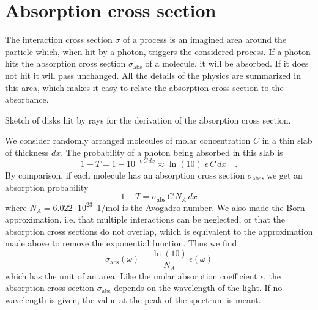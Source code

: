\section{Absorption cross section}


The interaction cross section $\sigma$ of a process is an imagined area around the particle which, when hit by a photon, triggers the considered process. If a photon hits the absorption cross section $\sigma_{\text{abs}}$ of a molecule, it will be absorbed. If it does not hit it will pass unchanged. All the details of the physics are summarized in this area, which makes it easy to relate the absorption cross section to the absorbance.


\begin{marginfigure}
\caption{Sketch of  disks hit by rays for the derivation of the absorption cross section.}
\end{marginfigure}


We consider randomly arranged molecules of molar concentration $C$ in a thin slab of thickness $dx$. The probability of a photon being absorbed in this slab is
\begin{equation}
 1 - T =1 - 10^{- \epsilon\, C \, dx} \approx \ln (10) \; \epsilon\, C \, dx \quad .
\end{equation}
By comparison, if each molecule has an absorption cross section $\sigma_{\text{abs}}$, we get an absorption probability 
\begin{equation}
 1 - T = \sigma_{\text{abs}} \, C \, N_A \, dx \label{eq:1_transmission_sigma}
\end{equation}
where $N_A = 6.022 \cdot 10^{23}$~{1/mol} is the Avogadro number.  We also made the Born approximation, i.e. that multiple interactions can be neglected, or that the absorption cross sections do not overlap, which is equivalent to the approximation made above to remove the exponential function.  Thus we find
\begin{equation}
 \sigma_{\text{abs}}(\omega) = \frac{\ln(10)}{ N_A } \, \epsilon(\omega)
\end{equation}
which has the unit of an area. Like the molar absorption coefficient $\epsilon$, the absorption cross section $\sigma_{\text{abs}}$ depends on the wavelength of the light. If no wavelength is given, the value at the peak of the spectrum is meant.


